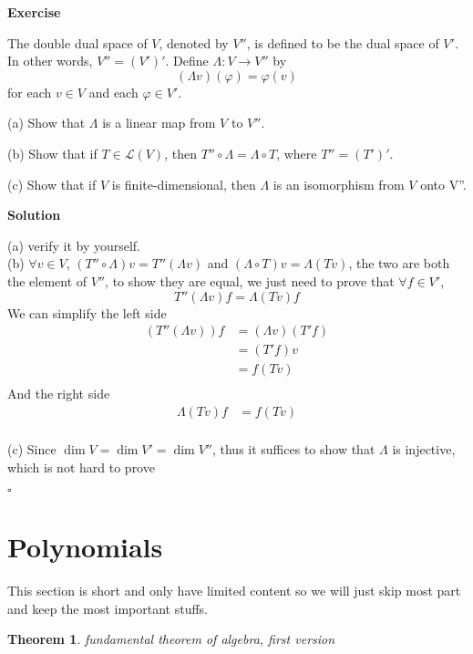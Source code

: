 \documentclass{article}
\newtheorem{theorem}{Theorem}[subsection]
\newenvironment{exercise}{%
{\textbf{Exercise\\}
    }
}{
}
\newenvironment{solution}{%
{
    \textbf{Solution\\}
    }
}{
  \hfill $\square$ 
  \par\bigskip 
}
\begin{document}
\begin{CJK}{UTF8}{gkai}
\begin{exercise}
    The double dual space of $V$, denoted by $V''$, is defined to be the dual space of $V'$. In other words, $V'' = (V')'$. Define $\Lambda : V \to V''$ by
    \[(\Lambda v)(\varphi) = \varphi(v)\]
    for each $v \in V$ and each $\varphi \in V'$.

    (a) Show that $\Lambda$ is a linear map from $V$ to $V''$.

    (b) Show that if $T \in \mathcal{L}(V)$, then $T'' \circ \Lambda  = \Lambda \circ T$, where $T'' = (T')'$.

    (c) Show that if $V$ is finite-dimensional, then $\Lambda$ is an isomorphism from $V$
    onto V''.
\end{exercise}

\begin{solution}
    (a) verify it by yourself.\\

    (b) $\forall v \in V$, $(T''\circ \Lambda)v = T''(\Lambda v) $ and $(\Lambda \circ T) v = \Lambda(T v)$, the two are both the element of $V''$, to show they are equal, we just need to prove that $\forall f\in V'$,
    \[T''(\Lambda v) f = \Lambda(T v) f\]
    We can simplify the left side
    \[
    \begin{aligned}
        (T''(\Lambda v)) f &= (\Lambda v) (T' f)\\
        &= (T' f) v\\
        &= f (T v)\\
    \end{aligned}    
    \]
    And the right side 
    \[
    \begin{aligned}
        \Lambda(T v) f&= f(Tv)\\
    \end{aligned}    
    \]

    (c) Since $\dim V = \dim V' = \dim V''$, thus it suffices to show that $\Lambda$ is injective, which is not hard to prove
\end{solution}

\section{Polynomials}
This section is short and only have limited content so we will just skip most part and keep the most important stuffs.\\

\begin{theorem}
    fundamental theorem of algebra, first version\\


\end{theorem}
\end{CJK}
\end{document}
